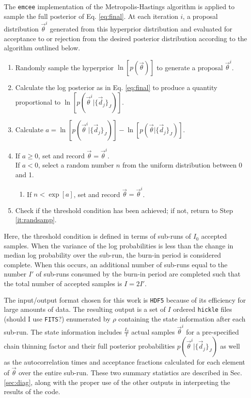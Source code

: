 \documentclass[preprint]{aastex}
\begin{document}
The \texttt{emcee} implementation of the Metropolis-Hastings algorithm is 
applied to sample the full posterior of Eq. \ref{eq:final}.   
\citep{Foreman-Mackey2013}   At each iteration $i$, a proposal distribution 
$\vec{\theta}^{i}$ generated from this hyperprior distribution and evaluated 
for acceptance to or rejection from the desired posterior distribution 
according to the algorithm outlined below.  

\begin{enumerate}
\item \label{it:randsamp} Randomly sample the hyperprior $\ln[p(\vec{\theta})]$ 
to generate a proposal $\vec{\theta}^{i}$.
\item Calculate the log posterior as in Eq. \ref{eq:final} to produce a 
quantity proportional to $\ln[p(\vec{\theta}^{i}|\{\vec{d}_{j}\}_{J})]$.
\item Calculate 
$a=\ln[p(\vec{\theta}^{i}|\{\vec{d}_{j}\}_{J})]-\ln[p(\vec{\theta}|\{\vec{d}_{j}
\}_{J})]$.
\item If $a\geq0$, set and record $\vec{\theta}=\vec{\theta}^{i}$.\\
If $a<0$, select a random number $n$ from the uniform distribution between 0 
and 1.
\begin{enumerate}
\item If $n<\exp[a]$, set and record $\vec{\theta}=\vec{\theta}^{i}$.
\end{enumerate}
\item Check if the threshold condition has been achieved; if not, return to 
Step \ref{it:randsamp}.
\end{enumerate}

Here, the threshold condition is defined in terms of sub-runs of $I_{0}$ 
accepted samples.  When the variance of the log probabilities is less than the 
change in median log probability over the sub-run, the burn-in period is 
considered complete.  When this occurs, an additional number of sub-runs equal 
to the number $I'$ of sub-runs consumed by the burn-in period are completed 
such that the total number of accepted samples is $I=2I'$.  

The input/output format chosen for this work is \texttt{HDF5} because of its 
efficiency for large amounts of data.  The resulting output is a set of $I$ 
ordered \texttt{hickle} files (should I use \texttt{FITS}?) enumerated by 
$\rho$ containing the state information after each sub-run.  The state 
information includes $\frac{I_{0}}{t}$ actual samples $\vec{\theta}^{i}$ for a 
pre-specified chain thinning factor and their full posterior probabilities 
$p(\vec{\theta}^{i}|\{\vec{d}_{j}\}_{J})$ as well as the autocorrelation times 
and acceptance fractions calculated for each element of $\vec{\theta}$ over the 
entire sub-run.  These two summary statistics are described in Sec. 
\ref{sec:diag}, along with the proper use of the other outputs in interpreting 
the results of the code.
\end{document}

